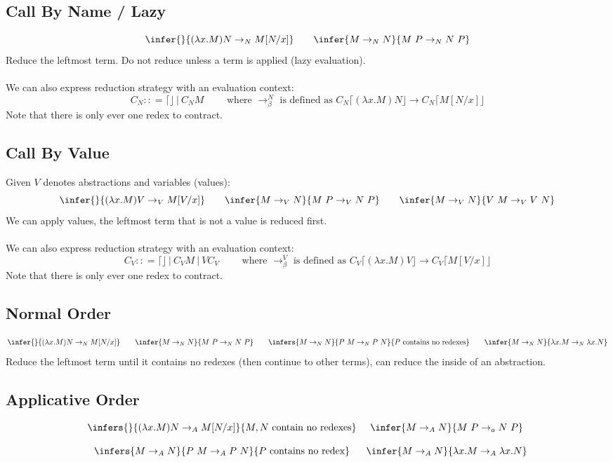 \subsection{Call By Name / Lazy}
\[\infer{}{(\lambda x . M) N \to_N M[N / x]} \qquad \infer{M \to_N N}{M \ P \to_N N \ P}\]
Reduce the leftmost term. Do not reduce unless a term is applied (lazy evaluation).
\\
\\ We can also express reduction strategy with an evaluation context:
\[C_N :: = \lceil \rfloor \ | \ C_N M \qquad \text{ where } \to_\beta^N \text{ is defined as }C_N\lceil (\lambda x.M) N \rfloor \to C_N \lceil M[N/x] \rfloor\]
Note that there is only ever one redex to contract.

\subsection{Call By Value}
Given $V$ denotes abstractions and variables (values):
\[\infer{}{(\lambda x . M) V \to_V M[V/x]} \qquad \infer{M \to_V N}{M \ P \to_V N \ P} \qquad \infer{M \to_V N}{V \ M \to_V V \ N}\]
We can apply values, the leftmost term that is not a value is reduced first.
\\
\\ We can also express reduction strategy with an evaluation context:
\[C_V :: = \lceil \rfloor \ | \ C_V M \ | \ V C_V \qquad \text{ where } \to_\beta^V \text{ is defined as }C_V\lceil (\lambda x.M) V \rfloor \to C_V \lceil M[V/x] \rfloor\]
Note that there is only ever one redex to contract.

\subsection{Normal Order}
\[\infer{}{(\lambda x. M) N \to_N M[N/x]} \qquad  \infer{M \to_N N}{M \ P \to_N N \ P} \qquad  \infers{M \to_N N}{P \ M \to_N P \ N}{P\text{ contains no redexes}} \qquad \infer{M \to_N N}{\lambda x. M \to_N \lambda x . N}\]
Reduce the leftmost term until it contains no redexes (then continue to other terms), can reduce the inside of an abstraction.

\subsection{Applicative Order}
\[\begin{matrix}
		\infers{}{(\lambda x. M) N \to_A M[N/x]}{M, N\text{ contain no redexes}} & \infer{M \to_A N}{M \ P \to_a N \ P}              \\
		\\
		\infers{M \to_A N}{P \ M \to_A P \ N}{P \text{ contains no redex}}       & \infer{M \to_A N}{\lambda x. M \to_A \lambda x.N} \\
	\end{matrix}\]


